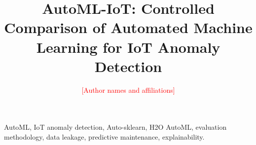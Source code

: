 \documentclass[journal]{IEEEtran}
\newcommand{\todo}[1]{\textcolor{red}{[#1]}}
\begin{document}
\title{AutoML-IoT: Controlled Comparison of Automated Machine Learning for IoT Anomaly Detection}
\author{\todo{Author names and affiliations}}
\maketitle

\begin{abstract}

\end{abstract}

\begin{IEEEkeywords}
AutoML, IoT anomaly detection, Auto-sklearn, H2O AutoML, evaluation methodology, data leakage, predictive maintenance, explainability.
\end{IEEEkeywords}















\end{document}
